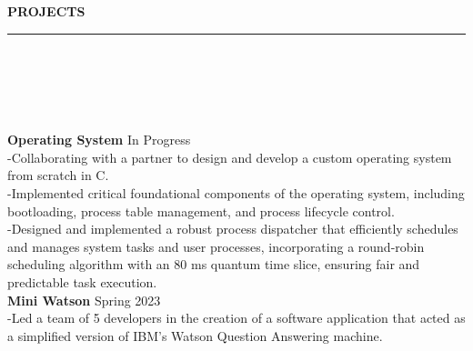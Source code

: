 \documentclass[10pt]{book}
\begin{document}
{        %
        \begin{spacing}{0.2}
            {
                \noindent\fontsize{12}{12}
                \\
                \\
                \selectfont\textbf{PROJECTS}
                \\
            }
            \rule{\linewidth}{0.4pt}
            \\
            \\
            \\
            \\
        \end{spacing}
        {
            \noindent\fontsize{11}{11}
            \selectfont\hspace{-3pt}\textbf{Operating System \textendash}\hfill In Progress
        }
        \\
        \hspace{2pt}-\hspace{6pt}Collaborating with a partner to design and develop a custom operating system from scratch in C.
        \\
        \hspace{2pt}-\hspace{6pt}Implemented critical foundational components of the operating system, including 
        bootloading, process table management, and process lifecycle control.
        \\
        \hspace{2pt}-\hspace{6pt}Designed and implemented a robust process dispatcher that efficiently schedules 
        and manages system tasks and user processes, incorporating a round-robin scheduling algorithm with an 80 
        ms quantum time slice, ensuring fair and predictable task execution.
        \\
        {
            \noindent\fontsize{11}{11}
            \selectfont\hspace{-3pt}\textbf{Mini Watson \textendash}\hfill Spring 2023
        }
        \\
        \hspace{2pt}-\hspace{6pt}Led a team of 5 developers in the creation of a software application 
        that acted as a simplified version of IBM's Watson Question Answering machine.
        \\
}
\end{document}
